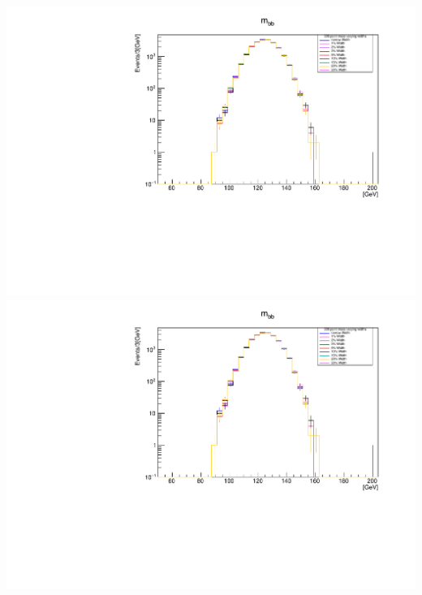 \documentclass[a4wide,10pt]{article}
\begin{document}
\includegraphics[scale=0.50,page=13]{../Pdfs/Smeared_bb->H_Mass_VaryingWidths.pdf}
\includegraphics[scale=0.50,page=14]{../Pdfs/Smeared_bb->H_Mass_VaryingWidths.pdf}
\end{document}
